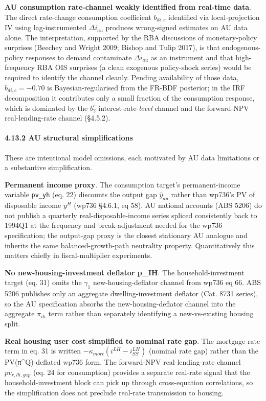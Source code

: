 \documentclass[
]{article}
\begin{document}
\textbf{AU consumption rate-channel weakly identified from real-time
data}. The direct rate-change consumption coefficient \(b_{di,c}\)
identified via local-projection IV using lag-instrumented
\(\Delta i_{au}\) produces wrong-signed estimates on AU data alone. The
interpretation, supported by the RBA discussions of monetary-policy
surprises (Beechey and Wright 2009; Bishop and Tulip 2017), is that
endogenous-policy responses to demand contaminate \(\Delta i_{au}\) as
an instrument and that high-frequency RBA OIS surprises (a clean
exogenous policy-shock series) would be required to identify the channel
cleanly. Pending availability of those data, \(b_{di,c} = -0.70\) is
Bayesian-regularised from the FR-BDF posterior; in the IRF decomposition
it contributes only a small fraction of the consumption response, which
is dominated by the \(b^c_2\) interest-rate-\emph{level} channel and the
forward-NPV real-lending-rate channel (§4.5.2).

\paragraph{4.13.2 AU structural
simplifications}\label{au-structural-simplifications}

These are intentional model omissions, each motivated by AU data
limitations or a substantive simplification.

\textbf{Permanent income proxy}. The consumption target's
permanent-income variable \texttt{pv\_yh} (eq. 22) discounts the output
gap \(\hat{y}_{au}\) rather than wp736's PV of disposable income \(y^H\)
(wp736 §4.6.1, eq 58). AU national accounts (ABS 5206) do not publish a
quarterly real-disposable-income series spliced consistently back to
1994Q1 at the frequency and break-adjustment needed for the wp736
specification; the output-gap proxy is the closest stationary AU
analogue and inherits the same balanced-growth-path neutrality property.
Quantitatively this matters chiefly in fiscal-multiplier experiments.

\textbf{No new-housing-investment deflator p\_IH}. The
household-investment target (eq. 31) omits the \(\gamma_1\)
new-housing-deflator channel from wp736 eq 66. ABS 5206 publishes only
an aggregate dwelling-investment deflator (Cat. 8731 series), so the AU
specification absorbs the new-housing-deflator channel into the
aggregate \(\pi_{ih}\) term rather than separately identifying a
new-vs-existing housing split.

\textbf{Real housing user cost simplified to nominal rate gap}. The
mortgage-rate term in eq. 31 is written
\(-\kappa_{mort}(i^{LH} - i^{LH}_{SS})\) (nominal rate gap) rather than
the PV(π\^{}Q)-deflated wp736 form. The forward-NPV real-lending-rate
channel \(pv_{r,lh,gap}\) (eq. 24 for consumption) provides a separate
real-rate signal that the household-investment block can pick up through
cross-equation correlations, so the simplification does not preclude
real-rate transmission to housing.
\end{document}

